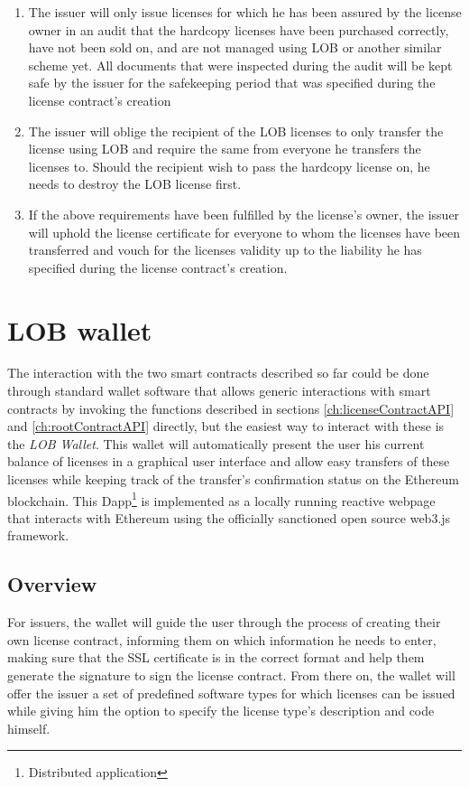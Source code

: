 \documentclass[a4paper]{article}
\begin{document}
\begin{enumerate}
  \item The issuer will only issue licenses for which he has been assured by the license owner in an audit that the hardcopy licenses have been purchased correctly, have not been sold on, and are not managed using LOB or another similar scheme yet. All documents that were inspected during the audit will be kept safe by the issuer for the safekeeping period that was specified during the license contract's creation
  \item The issuer will oblige the recipient of the LOB licenses to only transfer the license using LOB and require the same from everyone he transfers the licenses to. Should the recipient wish to pass the hardcopy license on, he needs to destroy the LOB license first.
  \item If the above requirements have been fulfilled by the license's owner, the issuer will uphold the license certificate for everyone to whom the licenses have been transferred and vouch for the licenses validity up to the liability he has specified during the license contract's creation.
\end{enumerate}



\section{LOB wallet}
\label{ch:wallet}

The interaction with the two smart contracts described so far could be done through standard wallet software that allows generic interactions with smart contracts by invoking the functions described in sections \ref{ch:licenseContractAPI} and \ref{ch:rootContractAPI} directly, but the easiest way to interact with these is the \emph{LOB Wallet}. This wallet will automatically present the user his current balance of licenses in a graphical user interface and allow easy transfers of these licenses while keeping track of the transfer's confirmation status on the Ethereum blockchain. This Dapp\footnote{Distributed application} is implemented as a locally running reactive webpage that interacts with Ethereum using the officially sanctioned open source web3.js framework.

\subsection{Overview}

For issuers, the wallet will guide the user through the process of creating their own license contract, informing them on which information he needs to enter, making sure that the SSL certificate is in the correct format and help them generate the signature to sign the license contract. From there on, the wallet will offer the issuer a set of predefined software types for which licenses can be issued while giving him the option to specify the license type's description and code himself.
\end{document}
